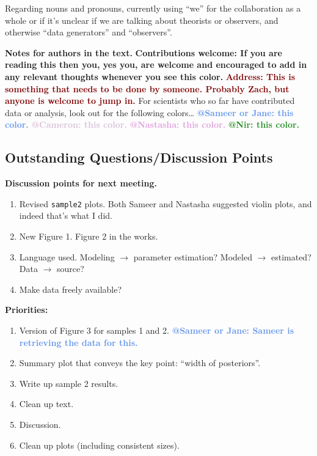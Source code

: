 \documentclass[fleqn,usenatbib]{mnras}
\makeatletter
\newcommand{\thoughts}[1]{\textcolor{BurntOrange}{\textbf{Contributions welcome: #1}}}
\newcommand{\todo}[1]{\textcolor{Maroon}{\textbf{Address: #1}}}
\newcommand{\atsameer}[1]{\textcolor{CornflowerBlue}{\textbf{@Sameer or Jane: #1}}}
\newcommand{\atcameron}[1]{\textcolor{Thistle}{\textbf{@Cameron: #1}}}
\newcommand{\atnastasha}[1]{\textcolor{Plum}{\textbf{@Nastasha: #1}}}
\newcommand{\atnir}[1]{\textcolor{ForestGreen}{\textbf{@Nir: #1}}}
\makeatother
\begin{document}
Regarding nouns and pronouns, currently using ``we'' for the collaboration as a whole or if it's unclear if we are talking about theorists or observers, and otherwise ``data generators'' and ``observers''. 

\textbf{Notes for authors in the text.}
\thoughts{If you are reading this then you, yes you, are welcome and encouraged to add in any relevant thoughts whenever you see this color.}
\todo{This is something that needs to be done by someone. Probably Zach, but anyone is welcome to jump in.}
For scientists who so far have contributed data or analysis, look out for the following colors\ldots
\atsameer{this color.}
\atcameron{this color.}
\atnastasha{this color.}
\atnir{this color.}

\subsection{Outstanding Questions/Discussion Points}

\textbf{Discussion points for next meeting.}
\begin{enumerate}
    \item Revised \texttt{sample2} plots. Both Sameer and Nastasha suggested violin plots, and indeed that's what I did.
    \item New Figure 1. Figure 2 in the works.
    \item Language used. Modeling $\rightarrow$ parameter estimation? Modeled $\rightarrow$ estimated? Data $\rightarrow$ source?
    \item Make data freely available?
\end{enumerate}

\textbf{Priorities:}
\begin{enumerate}
    \item Version of Figure 3 for samples 1 and 2. \atsameer{Sameer is retrieving the data for this.}
    \item Summary plot that conveys the key point: ``width of posteriors''.
    \item Write up sample 2 results.
    \item Clean up text.
    \item Discussion.
    \item Clean up plots (including consistent sizes).
\end{enumerate}
\end{document}
